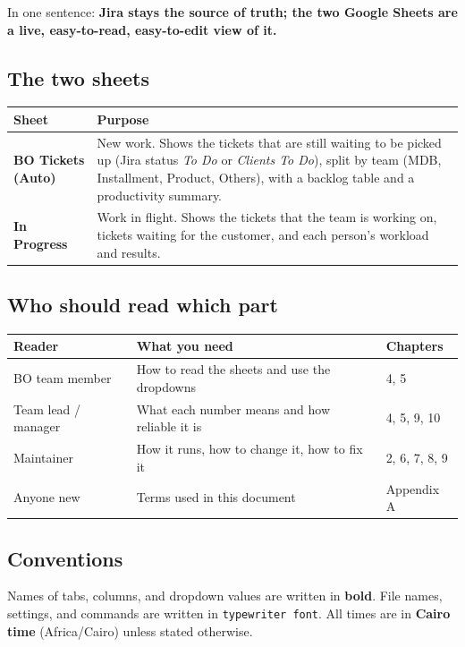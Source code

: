 \documentclass[11pt,a4paper]{article}
\newcommand{\code}[1]{\texttt{#1}}
\newcommand{\tab}[1]{\textbf{#1}}
\let\oldsubsection\subsection
\renewcommand{\subsection}{\needspace{7\baselineskip}\oldsubsection}
\begin{document}
In one sentence: \textbf{Jira stays the source of truth; the two Google Sheets are a live, easy-to-read, easy-to-edit
view of it.}

\subsection{The two sheets}
\begin{tabularx}{\linewidth}{@{}l L@{}}
\toprule
\textbf{Sheet} & \textbf{Purpose} \\
\midrule
\tab{BO Tickets (Auto)} & New work. Shows the tickets that are still waiting to be picked up (Jira status
\emph{To Do} or \emph{Clients To Do}), split by team (MDB, Installment, Product, Others), with a backlog table and a
productivity summary. \\
\tab{In Progress} & Work in flight. Shows the tickets that the team is working on, tickets waiting for the
customer, and each person's workload and results. \\
\bottomrule
\end{tabularx}

\subsection{Who should read which part}
\begin{tabularx}{\linewidth}{@{}l L l@{}}
\toprule
\textbf{Reader} & \textbf{What you need} & \textbf{Chapters} \\
\midrule
BO team member & How to read the sheets and use the dropdowns & 4, 5 \\
Team lead / manager & What each number means and how reliable it is & 4, 5, 9, 10 \\
Maintainer & How it runs, how to change it, how to fix it & 2, 6, 7, 8, 9 \\
Anyone new & Terms used in this document & Appendix A \\
\bottomrule
\end{tabularx}

\subsection{Conventions}
Names of tabs, columns, and dropdown values are written in \textbf{bold}. File names, settings, and commands are
written in \code{typewriter font}. All times are in \textbf{Cairo time} (Africa/Cairo) unless stated otherwise.

\end{document}
